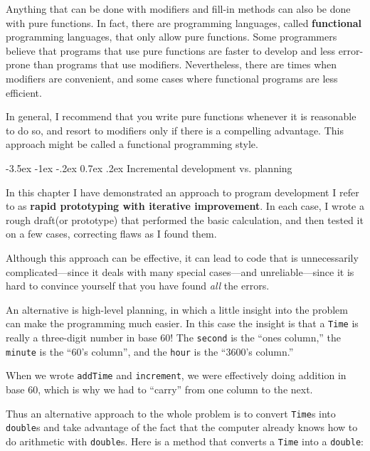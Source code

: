 \documentclass{book}
\makeatletter
\renewcommand{\section}{\@startsection 
    {section} {1} {0mm}%
    {-3.5ex \@plus -1ex \@minus -.2ex}%
    {0.7ex \@plus.2ex}%
    {\normalfont\Large\bfseries}}
\makeatother
\begin{document}
Anything that can be done with modifiers and fill-in methods can also
be done with pure functions.  In fact, there are programming
languages, called {\bf functional} programming languages, that only
allow pure functions.  Some programmers believe that programs that use
pure functions are faster to develop and less error-prone than
programs that use modifiers.  Nevertheless, there are times when
modifiers are convenient, and some cases where functional programs
are less efficient.

In general, I recommend that you write pure functions whenever
it is reasonable to do so, and resort to modifiers only if there
is a compelling advantage.  This approach might be called a
functional programming style.

\section{Incremental development vs. planning}

In this chapter I have demonstrated an approach to program
development I refer to as {\bf rapid prototyping with iterative
improvement}.  In each case, I wrote a rough draft(or prototype)
that performed the basic calculation, and then tested it on
a few cases, correcting flaws as I found them.

Although this approach can be effective, it can lead to code
that is unnecessarily complicated---since it deals with many
special cases---and unreliable---since it is hard to convince
yourself that you have found {\em all} the errors.

An alternative is high-level planning, in which a little insight
into the problem can make the programming much easier.  In
this case the insight is that a {\tt Time} is really a three-digit
number in base 60!  The {\tt second} is the ``ones column,''
the {\tt minute} is the ``60's column'', and the {\tt hour}
is the ``3600's column.''

When we wrote {\tt addTime} and {\tt increment}, we were effectively
doing addition in base 60, which is why we had to ``carry'' from one
column to the next.


Thus an alternative approach to the whole problem is to convert
{\tt Time}s into {\tt double}s and take advantage of the fact that
the computer already knows how to do arithmetic with {\tt double}s.
Here is a method that converts a {\tt Time} into a {\tt double}:
\end{document}

